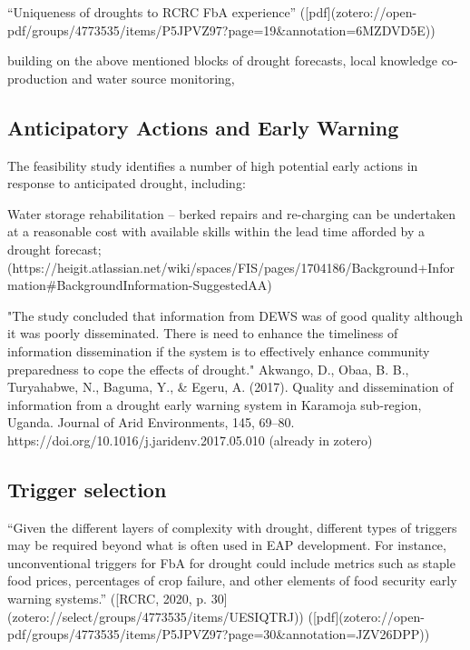 {%
“Uniqueness of droughts to RCRC FbA experience” ([pdf](zotero://open-pdf/groups/4773535/items/P5JPVZ97?page=19&annotation=6MZDVD5E))

building on the above mentioned blocks of drought forecasts, local knowledge co-production and water source monitoring, 


\subsection{Anticipatory Actions and Early Warning}
The feasibility study identifies a number of high potential early actions in response to anticipated drought, including:

Water storage rehabilitation – berked repairs and re-charging can be undertaken at a reasonable cost with available skills within the lead time afforded by a drought forecast; (https://heigit.atlassian.net/wiki/spaces/FIS/pages/1704186/Background+Information#BackgroundInformation-SuggestedAA)



"The study concluded that information from DEWS was of good quality although it was poorly disseminated. There is need to enhance the timeliness of information dissemination if the system is to effectively enhance community preparedness to cope the effects of drought." Akwango, D., Obaa, B. B., Turyahabwe, N., Baguma, Y., & Egeru, A. (2017). Quality and dissemination of information from a drought early warning system in Karamoja sub-region, Uganda. Journal of Arid Environments, 145, 69–80. https://doi.org/10.1016/j.jaridenv.2017.05.010 (already in zotero)





\subsection{Trigger selection}
“Given the different layers of complexity with drought, different types of triggers may be required beyond what is often used in EAP development. For instance, unconventional triggers for FbA for drought could include metrics such as staple food prices, percentages of crop failure, and other elements of food security early warning systems.” ([RCRC, 2020, p. 30](zotero://select/groups/4773535/items/UESIQTRJ)) ([pdf](zotero://open-pdf/groups/4773535/items/P5JPVZ97?page=30&annotation=JZV26DPP))


}
